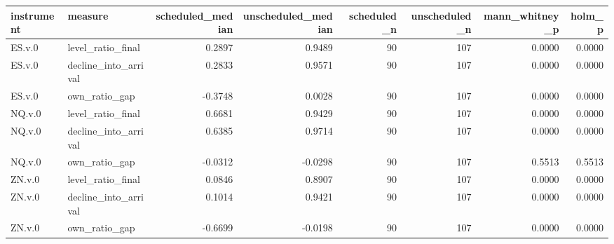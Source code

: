 \begin{tabular}{llrrrrrr}
\toprule
instrument & measure & scheduled_median & unscheduled_median & scheduled_n & unscheduled_n & mann_whitney_p & holm_p \\
\midrule
ES.v.0 & level_ratio_final & 0.2897 & 0.9489 & 90 & 107 & 0.0000 & 0.0000 \\
ES.v.0 & decline_into_arrival & 0.2833 & 0.9571 & 90 & 107 & 0.0000 & 0.0000 \\
ES.v.0 & own_ratio_gap & -0.3748 & 0.0028 & 90 & 107 & 0.0000 & 0.0000 \\
NQ.v.0 & level_ratio_final & 0.6681 & 0.9429 & 90 & 107 & 0.0000 & 0.0000 \\
NQ.v.0 & decline_into_arrival & 0.6385 & 0.9714 & 90 & 107 & 0.0000 & 0.0000 \\
NQ.v.0 & own_ratio_gap & -0.0312 & -0.0298 & 90 & 107 & 0.5513 & 0.5513 \\
ZN.v.0 & level_ratio_final & 0.0846 & 0.8907 & 90 & 107 & 0.0000 & 0.0000 \\
ZN.v.0 & decline_into_arrival & 0.1014 & 0.9421 & 90 & 107 & 0.0000 & 0.0000 \\
ZN.v.0 & own_ratio_gap & -0.6699 & -0.0198 & 90 & 107 & 0.0000 & 0.0000 \\
\bottomrule
\end{tabular}
